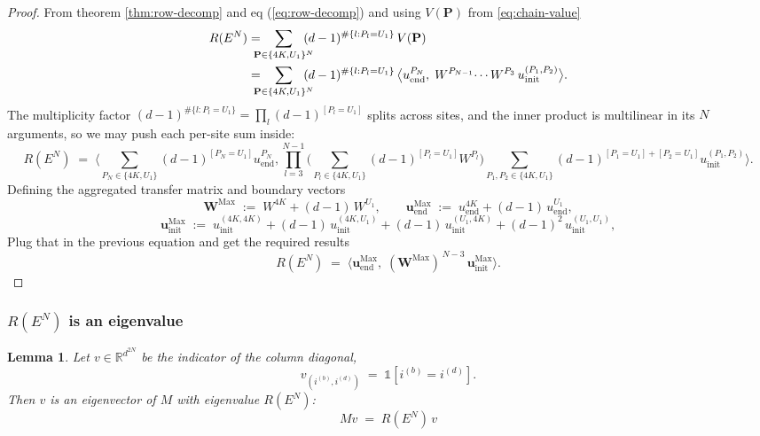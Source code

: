 \documentclass[12pt,a4paper]{article}
\newtheorem{lemma}[theorem]{Lemma}
\begin{document}
\begin{proof}
From theorem \ref{thm:row-decomp}  and eq (\eqref{eq:row-decomp}) and using $V(\mathbf{P})$ from \eqref{eq:chain-value} 
\begin{align}
R(E^N)
&= \!\!\!\!\!\sum_{\mathbf{P}\in\{4K,U_1\}^N}\!\!\!\!\!(d-1)^{\#\{l:P_l=U_1\}}\, V(\mathbf{P}) \notag \\
&= \!\!\!\!\!\sum_{\mathbf{P}\in\{4K,U_1\}^N}\!\!\!\!\!(d-1)^{\#\{l:P_l=U_1\}}\, \bigl\langle u_\mathrm{end}^{P_N},\; W^{P_{N-1}}\!\cdots W^{P_3}\, u_\mathrm{init}^{(P_1,P_2)}\bigr\rangle. 
\end{align}
The multiplicity factor $(d-1)^{\#\{l:P_l=U_1\}} = \prod_l (d-1)^{[P_l=U_1]}$ splits across sites, and the inner product is multilinear in its $N$ arguments, so we may push each per-site sum inside:
\begin{equation}
R(E^N)
\;=\; \biggl\langle \!\!\sum_{P_N\in\{4K,U_1\}}\!\!\!(d-1)^{[P_N=U_1]} u_\mathrm{end}^{P_N}, \prod_{l=3}^{N-1}\biggl(\sum_{P_l\in\{4K,U_1\}}\!\!\!(d-1)^{[P_l=U_1]} W^{P_l}\biggr) \!\!\!\!\!\sum_{P_1, P_2\in\{4K,U_1\}}\!\!\!\!\!(d-1)^{[P_1=U_1]+[P_2=U_1]} u_\mathrm{init}^{(P_1,P_2)} \biggr\rangle.
\end{equation}
Defining the aggregated transfer matrix and boundary vectors
\begin{equation}
\mathbf{W}^{\mathrm{Max}} \;:=\; W^{4K} + (d-1)\,W^{U_1},
\qquad
\mathbf{u}^{\mathrm{Max}}_{\mathrm{end}} \;:=\; u_\mathrm{end}^{4K} + (d-1)\,u_\mathrm{end}^{U_1},
\end{equation}
\begin{equation}
\mathbf{u}^{\mathrm{Max}}_{\mathrm{init}} \;:=\; u_\mathrm{init}^{(4K,4K)} + (d-1)\,u_\mathrm{init}^{(4K,U_1)} + (d-1)\,u_\mathrm{init}^{(U_1,4K)} + (d-1)^{2}\,u_\mathrm{init}^{(U_1,U_1)},
\end{equation}
Plug that in the previous equation and get the required results
\begin{equation}
\;R(E^N) \;=\; \bigl\langle \mathbf{u}^{\mathrm{Max}}_{\mathrm{end}},\; (\mathbf{W}^{\mathrm{Max}})^{\,N-3}\, \mathbf{u}^{\mathrm{Max}}_{\mathrm{init}}\bigr\rangle.\;
\end{equation}

\end{proof}

\subsubsection{$R(E^N)$  is an eigenvalue}
\begin{lemma}\label{lem:E_N_EIGENVALUE}
Let $v\in\mathbb{R}^{d^{2N}}$ be the indicator of the column diagonal,
\[
v_{(i^{(b)},i^{(d)})} \;=\; \mathbb{1}\!\left[i^{(b)}=i^{(d)}\right]
.
\]
Then $v$ is an eigenvector of $M$ with eigenvalue $R(E^{N})$:
\[
M v \;=\; R(E^{N})\,v

\]
\end{lemma}
\end{document}
